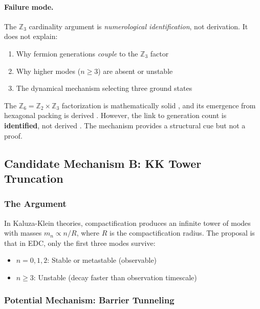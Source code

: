 \paragraph{Failure mode.}
The $\mathbb{Z}_3$ cardinality argument is \emph{numerological identification},
not derivation. It does not explain:
\begin{enumerate}[nosep]
    \item Why fermion generations \emph{couple} to the $\mathbb{Z}_3$ factor
    \item Why higher modes ($n \geq 3$) are absent or unstable
    \item The dynamical mechanism selecting three ground states
\end{enumerate}

\begin{tcolorbox}[colback=red!5, colframe=red!50!black,
    title=\textbf{Mechanism A Verdict: YELLOW/RED}]
The $\mathbb{Z}_6 = \mathbb{Z}_2 \times \mathbb{Z}_3$ factorization is mathematically
solid \tagM{}, and its emergence from hexagonal packing is derived \tagDc{}.
However, the link to generation count is \textbf{identified}, not derived \tagI{}.
The mechanism provides a structural cue but not a proof.
\end{tcolorbox}

\subsection{Candidate Mechanism B: KK Tower Truncation}
\label{sec:ch5_mechanism_b}

\subsubsection{The Argument}

In Kaluza-Klein theories, compactification produces an infinite tower of modes
with masses $m_n \propto n/R$, where $R$ is the compactification radius.
The proposal is that in EDC, only the first three modes survive:

\begin{itemize}[nosep]
    \item $n = 0, 1, 2$: Stable or metastable (observable)
    \item $n \geq 3$: Unstable (decay faster than observation timescale)
\end{itemize}

\subsubsection{Potential Mechanism: Barrier Tunneling}

